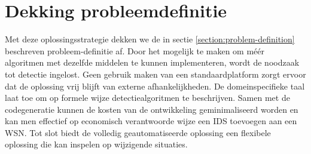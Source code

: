 \vspace{-3mm}

\section{Dekking probleemdefinitie}
\label{section:problem-coverage}

Met deze oplossingsstrategie dekken we de in sectie
\ref{section:problem-definition} beschreven probleem-definitie af. Door het
mogelijk te maken om m\'e\'er algoritmen met dezelfde middelen te kunnen
implementeren, wordt de noodzaak tot detectie ingelost. Geen gebruik maken van
een standaardplatform zorgt ervoor dat de oplossing vrij blijft van externe
afhankelijkheden. De domeinspecifieke taal laat toe om op formele wijze
detectiealgoritmen te beschrijven. Samen met de codegeneratie kunnen de kosten
van de ontwikkeling geminimaliseerd worden en kan men effectief op economisch
verantwoorde wijze een IDS toevoegen aan een WSN. Tot slot biedt de volledig
geautomatiseerde oplossing een flexibele oplossing die kan inspelen op
wijzigende situaties.

